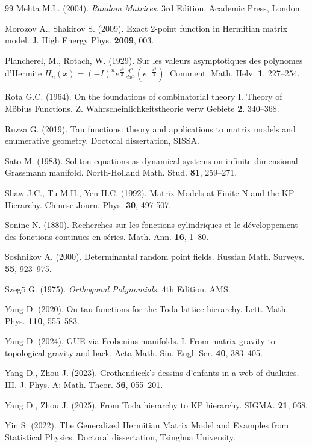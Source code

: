 \documentclass[a4paper]{article}
\theoremstyle{plain}
\theoremstyle{definition}
\begin{document}
\begin{thebibliography}{99}
Mehta M.L. (2004). {\it Random Matrices}. 3rd Edition. Academic Press, London.

Morozov A., Shakirov S. (2009). Exact 2-point function in Hermitian matrix model. J. High Energy Phys. {\bf 2009}, 003.

Plancherel, M., Rotach, W. (1929). Sur les valeurs asymptotiques des polynomes d'Hermite $H_n(x)=(-I)^ne^{\frac{{x^2}}{2}}\frac{{d^n}}{{dx^n}}\left({e^{-\frac{{x^2 }}{2}}}\right)$. Comment. Math. Helv. {\bf 1}, 227--254.

Rota G.C. (1964). On the foundations of combinatorial theory I. Theory of M\"obius Functions. Z. Wahrscheinlichkeitstheorie verw Gebiete {\bf 2}. 340--368.

Ruzza G. (2019). Tau functions: theory and applications to matrix models and enumerative geometry. Doctoral dissertation, SISSA.

Sato M. (1983). Soliton equations as dynamical systems on infinite dimensional Grassmann manifold. North-Holland Math. Stud. {\bf 81}, 259--271.

Shaw J.C., Tu M.H., Yen H.C. (1992). Matrix Models at Finite N and the KP Hierarchy. Chinese Journ. Phys. {\bf 30}, 497-507.

Sonine N. (1880). Recherches sur les fonctions cylindriques et le d\'eveloppement des fonctions continues en s\'eries. Math. Ann. {\bf 16}, 1--80.

Soshnikov A. (2000). Determinantal random point fields. Russian Math. Surveys. {\bf 55}, 923--975.

Szeg\"o G. (1975). {\it Orthogonal Polynomials}. 4th Edition. AMS.

Yang D. (2020). On tau-functions for the Toda lattice hierarchy. Lett. Math. Phys. {\bf 110}, 555--583.

Yang D. (2024). GUE via Frobenius manifolds. I. From matrix gravity to topological gravity and back. Acta Math. Sin. Engl. Ser. {\bf 40}, 383--405.

Yang D., Zhou J. (2023). Grothendieck's dessins d'enfants in a web of dualities. III. J. Phys. A: Math. Theor. {\bf 56}, 055--201.

Yang D., Zhou J. (2025). From Toda hierarchy to KP hierarchy. SIGMA. {\bf 21}, 068.

Yin S. (2022). The Generalized Hermitian Matrix Model and Examples from Statistical Physics. Doctoral dissertation, Tsinghua University.


\end{thebibliography}
\end{document}
